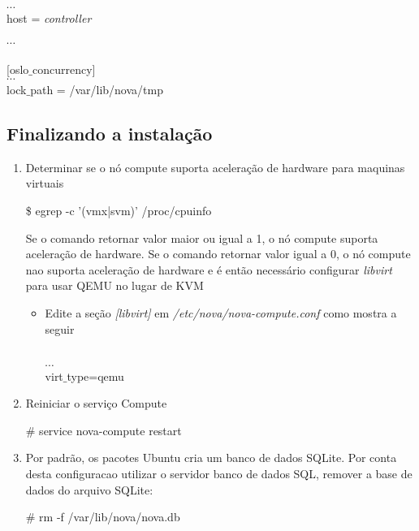 \begin{enumerate}
\begin{snugshade}
		[glance]\\
		$\cdots$		\\
		host = \emph{controller} \\ \\
		$\cdots$ \\ \\		
		
		[oslo$\_$concurrency] \\
		$\cdots$\\
		lock$\_$path = /var/lib/nova/tmp		
	\end{snugshade}
\end{enumerate}

\subsection{Finalizando a instalação}
\begin{enumerate}
	\item Determinar se o nó compute suporta aceleração de hardware para maquinas virtuais
	\begin{snugshade}
		\$ egrep -c '(vmx|svm)' /proc/cpuinfo
	\end{snugshade}
	
	Se o comando retornar valor maior ou igual a 1, o nó compute suporta aceleração de hardware.
	Se o comando retornar valor igual a 0, o nó compute nao suporta aceleração de hardware e é então necessário configurar \emph{libvirt} para usar QEMU no lugar de KVM
	
	\begin{itemize}
	 \item	Edite a seção \emph{[libvirt]} em \emph{/etc/nova/nova-compute.conf} como mostra a seguir
		\begin{snugshade}
			[libvirt]\\
			$\cdots$\\
			virt$\_$type=qemu
		\end{snugshade}
	\end{itemize}
	
	\item Reiniciar o serviço Compute
	\begin{snugshade}
		\# service nova-compute restart
	\end{snugshade}
	
	\item Por padrão, os pacotes Ubuntu cria um banco de dados SQLite. 
	Por conta desta configuracao utilizar o servidor banco de dados SQL, remover a base de dados do arquivo SQLite:
	\begin{snugshade}
		\# rm -f /var/lib/nova/nova.db
	\end{snugshade}		
\end{enumerate}

